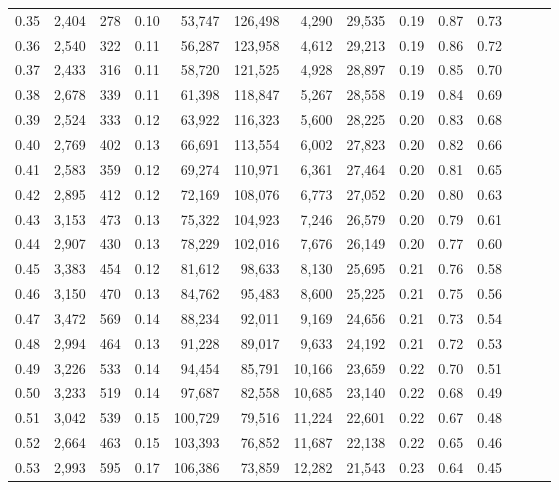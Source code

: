 \begin{tabular}{rrrrrrrrrrrrrr}
0.35 &  2,404 &    278 &  0.10 &   53,747 &  126,498 &   4,290 &  29,535 &  0.19 &  0.87 &      0.73 \\
0.36 &  2,540 &    322 &  0.11 &   56,287 &  123,958 &   4,612 &  29,213 &  0.19 &  0.86 &      0.72 \\
0.37 &  2,433 &    316 &  0.11 &   58,720 &  121,525 &   4,928 &  28,897 &  0.19 &  0.85 &      0.70 \\
0.38 &  2,678 &    339 &  0.11 &   61,398 &  118,847 &   5,267 &  28,558 &  0.19 &  0.84 &      0.69 \\
0.39 &  2,524 &    333 &  0.12 &   63,922 &  116,323 &   5,600 &  28,225 &  0.20 &  0.83 &      0.68 \\
0.40 &  2,769 &    402 &  0.13 &   66,691 &  113,554 &   6,002 &  27,823 &  0.20 &  0.82 &      0.66 \\
0.41 &  2,583 &    359 &  0.12 &   69,274 &  110,971 &   6,361 &  27,464 &  0.20 &  0.81 &      0.65 \\
0.42 &  2,895 &    412 &  0.12 &   72,169 &  108,076 &   6,773 &  27,052 &  0.20 &  0.80 &      0.63 \\
0.43 &  3,153 &    473 &  0.13 &   75,322 &  104,923 &   7,246 &  26,579 &  0.20 &  0.79 &      0.61 \\
0.44 &  2,907 &    430 &  0.13 &   78,229 &  102,016 &   7,676 &  26,149 &  0.20 &  0.77 &      0.60 \\
0.45 &  3,383 &    454 &  0.12 &   81,612 &   98,633 &   8,130 &  25,695 &  0.21 &  0.76 &      0.58 \\
0.46 &  3,150 &    470 &  0.13 &   84,762 &   95,483 &   8,600 &  25,225 &  0.21 &  0.75 &      0.56 \\
0.47 &  3,472 &    569 &  0.14 &   88,234 &   92,011 &   9,169 &  24,656 &  0.21 &  0.73 &      0.54 \\
0.48 &  2,994 &    464 &  0.13 &   91,228 &   89,017 &   9,633 &  24,192 &  0.21 &  0.72 &      0.53 \\
0.49 &  3,226 &    533 &  0.14 &   94,454 &   85,791 &  10,166 &  23,659 &  0.22 &  0.70 &      0.51 \\
0.50 &  3,233 &    519 &  0.14 &   97,687 &   82,558 &  10,685 &  23,140 &  0.22 &  0.68 &      0.49 \\
0.51 &  3,042 &    539 &  0.15 &  100,729 &   79,516 &  11,224 &  22,601 &  0.22 &  0.67 &      0.48 \\
0.52 &  2,664 &    463 &  0.15 &  103,393 &   76,852 &  11,687 &  22,138 &  0.22 &  0.65 &      0.46 \\
0.53 &  2,993 &    595 &  0.17 &  106,386 &   73,859 &  12,282 &  21,543 &  0.23 &  0.64 &      0.45 \\

\end{tabular}
